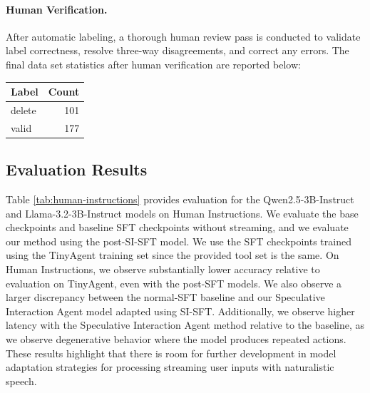 \paragraph{Human Verification.}
After automatic labeling, a thorough human review pass is conducted to validate label correctness, resolve three-way disagreements, and correct any errors. The final data set statistics after human verification are reported below:

\vspace{0.5em}
\begin{center}
\begin{tabular}{lr}
\textbf{Label} & \textbf{Count} \\
\hline
delete & 101 \\
valid & 177
\end{tabular}
\end{center}


\subsection{Evaluation Results}

Table \ref{tab:human-instructions} provides evaluation for the Qwen2.5-3B-Instruct and Llama-3.2-3B-Instruct models on Human Instructions. 
We evaluate the base checkpoints and baseline SFT checkpoints without streaming, and we evaluate our method using the post-SI-SFT model.
We use the SFT checkpoints trained using the TinyAgent training set since the provided tool set is the same.
On Human Instructions, we observe substantially lower accuracy relative to evaluation on TinyAgent, even with the post-SFT models. 
We also observe a larger discrepancy between the normal-SFT baseline and our Speculative Interaction Agent model adapted using SI-SFT.
Additionally, we observe higher latency with the Speculative Interaction Agent method relative to the baseline, as we observe degenerative behavior where the model produces repeated actions.
These results highlight that there is room for further development in model adaptation strategies for processing streaming user inputs with naturalistic speech.


